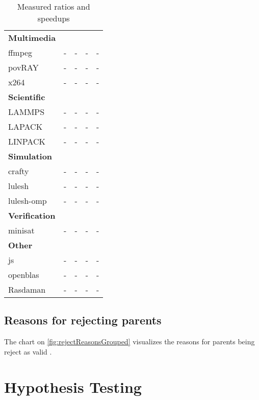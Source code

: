 \begin{table}[!ht]
{\begin{minipage}{\textwidth}
\begin{tabularx}{\textwidth}{Xcccc}
                \textbf{Multimedia}\\
                ffmpeg & - & - & - & -\\
                povRAY & - & - & - & -\\
                x264 & - & - & - & -\\
                \midrule
                \textbf{Scientific}\\
                LAMMPS & - & - & - & -\\
                LAPACK & - & - & - & -\\
                LINPACK & - & - & - & -\\
                \midrule
                \textbf{Simulation}\\
                crafty & - & - & - & -\\
                lulesh & - & - & - & -\\
                lulesh-omp & - & - & - & -\\

                \midrule
                \textbf{Verification}\\
                minisat & - & - & - & -\\
                \midrule
                \textbf{Other}\\
                js & - & - & - & -\\
                openblas & - & - & - & -\\
                Rasdaman & - & - & - & -\\
                \bottomrule
            \end{tabularx}
            \caption{Measured ratios and speedups}
            \label{tab:ratiosAndSpeedups}
        \end{minipage}
    }
\end{table}
\subsection{Reasons for rejecting parents}
The chart on \autoref{fig:rejectReasonsGrouped} visualizes the reasons for parents being reject as valid \scops.
\section{Hypothesis Testing}
